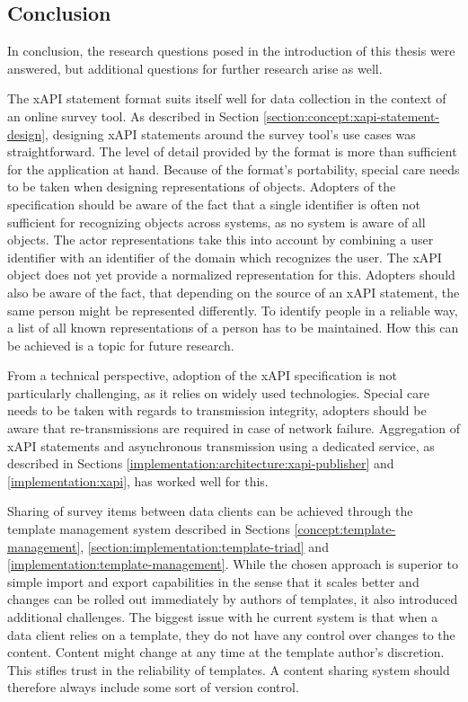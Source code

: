     \subsection{Conclusion}

    In conclusion, the research questions posed in the introduction of this
    thesis were answered, but additional questions for further research arise
    as well.

    The xAPI statement format suits itself well for data collection
    in the context of an online survey tool. As described in Section \ref{section:concept:xapi-statement-design},
    designing xAPI statements around the survey tool's use cases was
    straightforward. The level of detail provided by the format is
    more than sufficient for the application at hand. Because of the
    format's portability, special care needs to be taken when designing
    representations of objects. Adopters of the specification should
    be aware of the fact that a single identifier is often not sufficient
    for recognizing objects across systems, as no system is aware of all objects.
    The actor representations take this into account by combining a user identifier
    with an identifier of the domain which recognizes the user. The xAPI object does not yet
    provide a normalized representation for this. Adopters should also be aware
    of the fact, that depending on the source of an xAPI statement, the same person
    might be represented differently. To identify people in a reliable way,
    a list of all known representations of a person has to be maintained.
    How this can be achieved is a topic for future research.
    
    From a technical perspective, adoption of the xAPI specification is
    not particularly challenging, as it relies on widely used technologies.
    Special care needs to be taken with regards to transmission integrity,
    adopters should be aware that re-transmissions are required in case of
    network failure. Aggregation of xAPI statements and asynchronous transmission
    using a dedicated service, as described in Sections \ref{implementation:architecture:xapi-publisher}
    and \ref{implementation:xapi}, has worked well for this.

    Sharing of survey items between data clients can be achieved through
    the template management system described in Sections \ref{concept:template-management},
    \ref{section:implementation:template-triad} and \ref{implementation:template-management}.
    While the chosen approach is superior to simple import and export capabilities
    in the sense that it scales better and changes can be rolled out immediately 
    by authors of templates, it also introduced additional challenges.
    The biggest issue with he current system is that when a data client relies on a template,
    they do not have any control over changes to the content. Content might change
    at any time at the template author's discretion. This stifles trust in the reliability
    of templates. A content sharing system should therefore always include some sort
    of version control.

